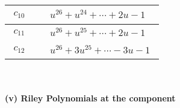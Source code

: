 \documentclass[1p]{elsarticle_modified}
\theoremstyle{definition}
\begin{document}
\begin{tabular}{m{50pt}|m{274pt}}
\hline $$\begin{aligned}c_{10}\end{aligned}$$&$\begin{aligned}
&u^{26}+u^{24}+\cdots+2 u-1
\end{aligned}$\\
\hline $$\begin{aligned}c_{11}\end{aligned}$$&$\begin{aligned}
&u^{26}+u^{25}+\cdots+2 u-1
\end{aligned}$\\
\hline $$\begin{aligned}c_{12}\end{aligned}$$&$\begin{aligned}
&u^{26}+3 u^{25}+\cdots-3 u-1
\end{aligned}$\\
\hline
\end{tabular}\\~\\
\newpage\renewcommand{\arraystretch}{1}
\flushleft \textbf{(v) Riley Polynomials at the component}\newline \\
\end{document}
